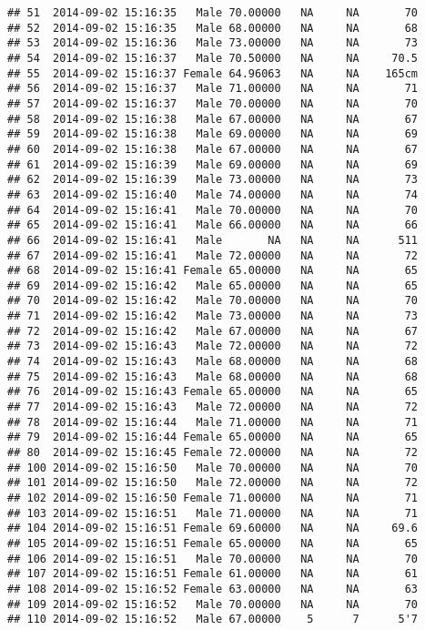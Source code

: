 \documentclass[
]{article}
\begin{document}
\begin{verbatim}
## 51  2014-09-02 15:16:35   Male 70.00000   NA     NA       70
## 52  2014-09-02 15:16:35   Male 68.00000   NA     NA       68
## 53  2014-09-02 15:16:36   Male 73.00000   NA     NA       73
## 54  2014-09-02 15:16:37   Male 70.50000   NA     NA     70.5
## 55  2014-09-02 15:16:37 Female 64.96063   NA     NA    165cm
## 56  2014-09-02 15:16:37   Male 71.00000   NA     NA       71
## 57  2014-09-02 15:16:37   Male 70.00000   NA     NA       70
## 58  2014-09-02 15:16:38   Male 67.00000   NA     NA       67
## 59  2014-09-02 15:16:38   Male 69.00000   NA     NA       69
## 60  2014-09-02 15:16:38   Male 67.00000   NA     NA       67
## 61  2014-09-02 15:16:39   Male 69.00000   NA     NA       69
## 62  2014-09-02 15:16:39   Male 73.00000   NA     NA       73
## 63  2014-09-02 15:16:40   Male 74.00000   NA     NA       74
## 64  2014-09-02 15:16:41   Male 70.00000   NA     NA       70
## 65  2014-09-02 15:16:41   Male 66.00000   NA     NA       66
## 66  2014-09-02 15:16:41   Male       NA   NA     NA      511
## 67  2014-09-02 15:16:41   Male 72.00000   NA     NA       72
## 68  2014-09-02 15:16:41 Female 65.00000   NA     NA       65
## 69  2014-09-02 15:16:42   Male 65.00000   NA     NA       65
## 70  2014-09-02 15:16:42   Male 70.00000   NA     NA       70
## 71  2014-09-02 15:16:42   Male 73.00000   NA     NA       73
## 72  2014-09-02 15:16:42   Male 67.00000   NA     NA       67
## 73  2014-09-02 15:16:43   Male 72.00000   NA     NA       72
## 74  2014-09-02 15:16:43   Male 68.00000   NA     NA       68
## 75  2014-09-02 15:16:43   Male 68.00000   NA     NA       68
## 76  2014-09-02 15:16:43 Female 65.00000   NA     NA       65
## 77  2014-09-02 15:16:43   Male 72.00000   NA     NA       72
## 78  2014-09-02 15:16:44   Male 71.00000   NA     NA       71
## 79  2014-09-02 15:16:44 Female 65.00000   NA     NA       65
## 80  2014-09-02 15:16:45 Female 72.00000   NA     NA       72
## 100 2014-09-02 15:16:50   Male 70.00000   NA     NA       70
## 101 2014-09-02 15:16:50   Male 72.00000   NA     NA       72
## 102 2014-09-02 15:16:50 Female 71.00000   NA     NA       71
## 103 2014-09-02 15:16:51   Male 71.00000   NA     NA       71
## 104 2014-09-02 15:16:51 Female 69.60000   NA     NA     69.6
## 105 2014-09-02 15:16:51 Female 65.00000   NA     NA       65
## 106 2014-09-02 15:16:51   Male 70.00000   NA     NA       70
## 107 2014-09-02 15:16:51 Female 61.00000   NA     NA       61
## 108 2014-09-02 15:16:52 Female 63.00000   NA     NA       63
## 109 2014-09-02 15:16:52   Male 70.00000   NA     NA       70
## 110 2014-09-02 15:16:52   Male 67.00000    5      7      5'7

\end{verbatim}
\end{document}
